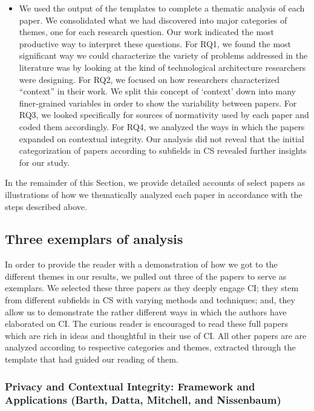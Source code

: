 \documentclass[../thesis.tex]{subfiles}
\begin{document}
\begin{itemize}
\item We used the output of the templates to complete a thematic
analysis of each paper. We consolidated what we had discovered into
major categories of themes, one for each research question. Our work
indicated the most productive way to interpret these questions. For
RQ1, we found the most significant way we could characterize the
variety of problems addressed in the literature was by looking at the
kind of technological architecture researchers were designing. For RQ2,
we focused on how researchers characterized
``context'' in their work. We split
this concept of `context' down into many
finer-grained variables in order to show the variability between
papers. For RQ3, we looked specifically for sources of normativity used
by each paper and coded them accordingly. For RQ4, we analyzed the ways
in which the papers expanded on contextual integrity. Our analysis did
not reveal that the initial categorization of papers according to
subfields in CS revealed further insights for our study.
\end{itemize}

\bigskip

In the remainder of this Section, we provide detailed accounts of select
papers as illustrations of how we thematically analyzed each paper in
accordance with the steps described above.

\subsection{Three exemplars of analysis}
\label{CI3.3}

In order to provide the reader with a demonstration of how we got to the
different themes in our results, we pulled out three of the papers to
serve as exemplars. We selected these three papers as they deeply
engage CI; they stem from different subfields in CS with varying
methods and techniques; and, they allow us to demonstrate the rather
different ways in which the authors have elaborated on CI. The curious
reader is encouraged to read these full papers which are rich in ideas
and thoughtful in their use of CI. All other papers are are analyzed
according to respective categories and themes, extracted through the
template that had guided our reading of them.

\subsubsection{Privacy and Contextual Integrity: Framework and Applications
  (Barth, Datta, Mitchell, and Nissenbaum)}
\label{CI3.3.1}
\end{document}
